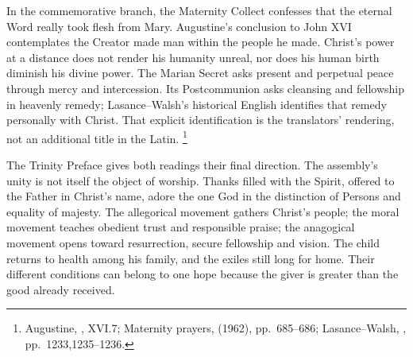 In the commemorative branch, the Maternity Collect confesses that
the eternal Word really took flesh from Mary. Augustine's conclusion
to John XVI contemplates the Creator made man within the people he
made. Christ's power at a distance does not render his humanity
unreal, nor does his human birth diminish his divine power. The
Marian Secret asks present and perpetual peace through mercy and
intercession. Its Postcommunion asks cleansing and fellowship in
heavenly remedy; Lasance--Walsh's historical English identifies that
remedy personally with Christ. That explicit identification is the
translators' rendering, not an additional title in the Latin.
\footnote{Augustine, , XVI.7; Maternity prayers,
 (1962), pp.~685--686; Lasance--Walsh,
, pp.~1233,1235--1236.}

The Trinity Preface gives both readings their final direction.
The assembly's unity is not itself the object of worship. Thanks
filled with the Spirit, offered to the Father in Christ's name,
adore the one God in the distinction of Persons and equality of
majesty. The allegorical movement gathers Christ's people; the moral
movement teaches obedient trust and responsible praise; the anagogical
movement opens toward resurrection, secure fellowship and vision.
The child returns to health among his family, and the exiles
still long for home. Their different conditions can belong to one
hope because the giver is greater than the good already received.

